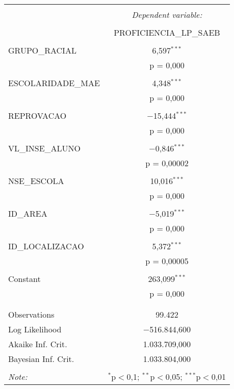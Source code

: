 \begin{table}[!htbp] \centering 
  \caption{} 
  \label{} 
\begin{tabular}{@{\extracolsep{5pt}}lc} 
\\[-1.8ex]\hline 
\hline \\[-1.8ex] 
 & \multicolumn{1}{c}{\textit{Dependent variable:}} \\ 
\cline{2-2} 
\\[-1.8ex] & PROFICIENCIA\_LP\_SAEB \\ 
\hline \\[-1.8ex] 
 GRUPO\_RACIAL & 6,597$^{***}$ \\ 
  & p = 0,000 \\ 
  & \\ 
 ESCOLARIDADE\_MAE & 4,348$^{***}$ \\ 
  & p = 0,000 \\ 
  & \\ 
 REPROVACAO & $-$15,444$^{***}$ \\ 
  & p = 0,000 \\ 
  & \\ 
 VL\_INSE\_ALUNO & $-$0,846$^{***}$ \\ 
  & p = 0,00002 \\ 
  & \\ 
 NSE\_ESCOLA & 10,016$^{***}$ \\ 
  & p = 0,000 \\ 
  & \\ 
 ID\_AREA & $-$5,019$^{***}$ \\ 
  & p = 0,000 \\ 
  & \\ 
 ID\_LOCALIZACAO & 5,372$^{***}$ \\ 
  & p = 0,00005 \\ 
  & \\ 
 Constant & 263,099$^{***}$ \\ 
  & p = 0,000 \\ 
  & \\ 
\hline \\[-1.8ex] 
Observations & 99.422 \\ 
Log Likelihood & $-$516.844,600 \\ 
Akaike Inf. Crit. & 1.033.709,000 \\ 
Bayesian Inf. Crit. & 1.033.804,000 \\ 
\hline 
\hline \\[-1.8ex] 
\textit{Note:}  & \multicolumn{1}{r}{$^{*}$p$<$0,1; $^{**}$p$<$0,05; $^{***}$p$<$0,01} \\ 
\end{tabular} 
\end{table} 

